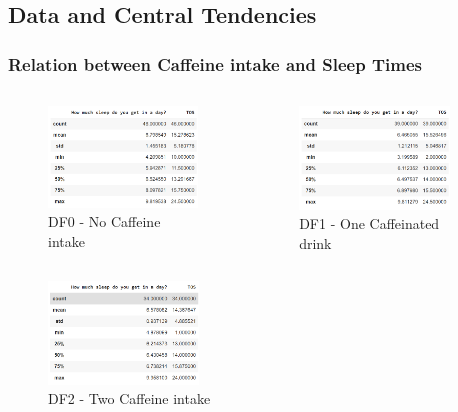\documentclass[11pt,]{beamer}
\begin{document}
\subsection{Data and Central Tendencies}

\begin{frame}


    \frametitle{Relation between Caffeine intake and Sleep Times}
    
    \begin{columns}[c]
    
        \begin{column}{.5\textwidth}
        \begin{figure}
    		\includegraphics[width=4cm]{DF0.png}
    		\caption{\tiny{DF0 - No Caffeine intake}}
    	\end{figure}
    	\end{column}
    	
    	\begin{column}{.5\textwidth}
    	\begin{figure}
    		\includegraphics[width=4cm]{DF1.png}
    		\caption{\tiny{DF1 - One Caffeinated drink}}
    	\end{figure}
    	\end{column}
    	
    \end{columns}
    
    \begin{columns}[c]
    
        \begin{column}{.5\textwidth}
        \begin{figure}
    		\includegraphics[width=4cm]{DF2.png}
    		\caption{\tiny{DF2 - Two Caffeine intake}}
    	\end{figure}
    	\end{column}
    	

\end{columns}
\end{frame}
\end{document}
